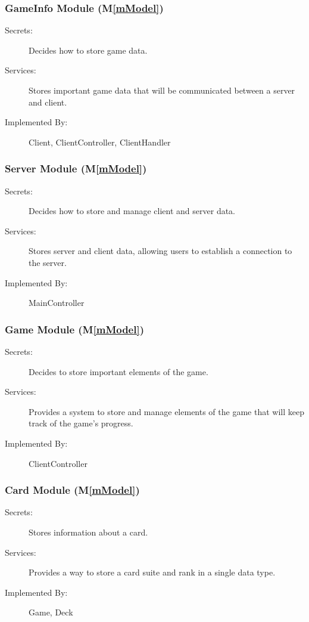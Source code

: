 \documentclass[12pt, titlepage]{article}
\newcommand{\mref}[1]{M\ref{#1}}
\begin{document}
\subsubsection{ GameInfo Module (\mref{mModel})}
    \begin{description}
    \item[Secrets:] Decides how to store game data.
    \item[Services:] Stores important game data that will be communicated between a server and client.
    \item[Implemented By:] Client, ClientController, ClientHandler
    \end{description}

\subsubsection{ Server Module (\mref{mModel})}
    \begin{description}
    \item[Secrets:] Decides how to store and manage client and server data.
    \item[Services:] Stores server and client data, allowing users to establish a connection to the server.
    \item[Implemented By:] MainController
    \end{description}

\subsubsection{ Game Module (\mref{mModel})}
    \begin{description}
    \item[Secrets:] Decides to store important elements of the game.
    \item[Services:] Provides a system to store and manage elements of the game that will keep track of the game's progress.
    \item[Implemented By:] ClientController
    \end{description}

\subsubsection{ Card Module (\mref{mModel})}
    \begin{description}
    \item[Secrets:] Stores information about a card.
    \item[Services:] Provides a way to store a card suite and rank in a single data type.
    \item[Implemented By:] Game, Deck
    \end{description}
\end{document}

